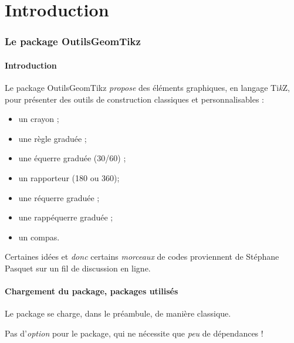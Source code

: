 \documentclass[french,a4paper,11pt]{article}
\providecommand\tikzlogo{Ti\textit{k}Z}
\let\TikZ\tikzlogo
\begin{document}
\part{Introduction}

\section{Le package OutilsGeomTikz}

\subsection{Introduction}

\begin{noteblock}
Le package \textsf{OutilsGeomTikz} \textit{propose} des éléments graphiques, en langage \TikZ, pour présenter des outils de construction classiques et personnalisables :

\begin{itemize}
	\item un crayon ;
	\item une règle graduée ;
	\item une équerre graduée (30/60) ;
	\item un rapporteur (180 ou 360);
	\item une réquerre graduée ;
	\item une \og rappéquerre \fg{} graduée ;
	\item un compas.
\end{itemize}
\vspace*{-\baselineskip}\leavevmode
\end{noteblock}

\begin{cautionblock}
Certaines idées et \textit{donc} certains \textit{morceaux} de codes proviennent de Stéphane Pasquet\footnotemark{} sur un fil de discussion en ligne.
\end{cautionblock}

\subsection{Chargement du package, packages utilisés}

\begin{importantblock}
Le package se charge, dans le préambule, de manière classique.

Pas d'\textit{option} pour le package, qui ne nécessite que \textit{peu} de dépendances !
\end{importantblock}
\end{document}
